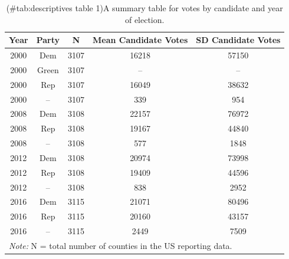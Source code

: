 \documentclass[
  english,
  man]{apa6}
\begin{document}
\begin{table}

\caption{(\#tab:descriptives table 1)A summary table for votes by candidate and year of election.}
\centering
\begin{tabular}[t]{c|c|c|c|c}
\hline
Year & Party & N & Mean Candidate Votes & SD Candidate Votes\\
\hline
2000 & Dem & 3107 & 16218 & 57150\\
\hline
2000 & Green & 3107 & -- & --\\
\hline
2000 & Rep & 3107 & 16049 & 38632\\
\hline
2000 & -- & 3107 & 339 & 954\\
\hline
2008 & Dem & 3108 & 22157 & 76972\\
\hline
2008 & Rep & 3108 & 19167 & 44840\\
\hline
2008 & -- & 3108 & 577 & 1848\\
\hline
2012 & Dem & 3108 & 20974 & 73998\\
\hline
2012 & Rep & 3108 & 19409 & 44596\\
\hline
2012 & -- & 3108 & 838 & 2952\\
\hline
2016 & Dem & 3115 & 21071 & 80496\\
\hline
2016 & Rep & 3115 & 20160 & 43157\\
\hline
2016 & -- & 3115 & 2449 & 7509\\
\hline
\multicolumn{5}{l}{\rule{0pt}{1em}\textit{Note: } N = total number of counties in the US reporting data.}\\
\end{tabular}
\end{table}
\end{document}
